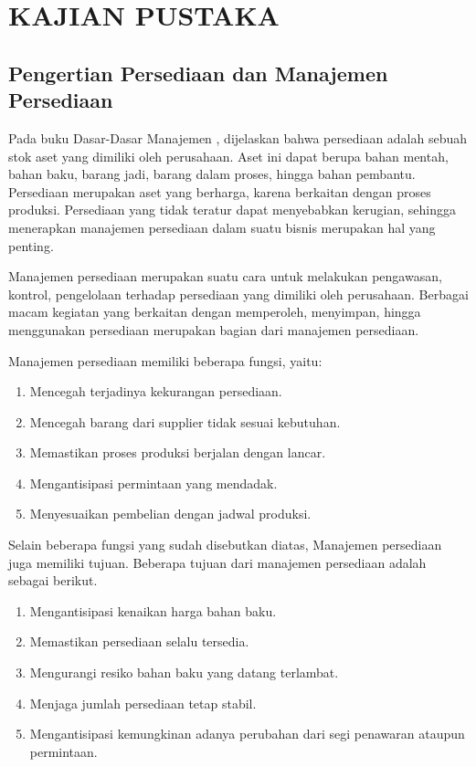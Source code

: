 
\chapter{KAJIAN PUSTAKA} 

\section{Pengertian Persediaan dan Manajemen Persediaan}

Pada buku Dasar-Dasar Manajemen \citep{dasarmanajemen}, dijelaskan bahwa persediaan adalah sebuah stok aset yang dimiliki oleh perusahaan. Aset ini dapat berupa bahan mentah, bahan baku, barang jadi, barang dalam proses, hingga bahan pembantu. Persediaan merupakan aset yang berharga, karena berkaitan dengan proses produksi. Persediaan yang tidak teratur dapat menyebabkan kerugian, sehingga menerapkan manajemen persediaan dalam suatu bisnis merupakan hal yang penting. 

Manajemen persediaan merupakan suatu cara untuk melakukan pengawasan, kontrol, pengelolaan terhadap persediaan yang dimiliki oleh perusahaan. Berbagai macam kegiatan yang berkaitan dengan memperoleh, menyimpan, hingga menggunakan persediaan merupakan bagian dari manajemen persediaan.

Manajemen persediaan memiliki beberapa fungsi, yaitu:
\begin{enumerate}
	\item Mencegah terjadinya kekurangan persediaan.
	\item Mencegah barang dari supplier tidak sesuai kebutuhan.
	\item Memastikan proses produksi berjalan dengan lancar.
	\item Mengantisipasi permintaan yang mendadak.
	\item Menyesuaikan pembelian dengan jadwal produksi.
\end{enumerate}

Selain beberapa fungsi yang sudah disebutkan diatas, Manajemen persediaan juga memiliki tujuan. Beberapa tujuan dari manajemen persediaan adalah sebagai berikut.
\begin{enumerate}
	\item Mengantisipasi kenaikan harga bahan baku.
	\item Memastikan persediaan selalu tersedia.
	\item Mengurangi resiko bahan baku yang datang terlambat.
	\item Menjaga jumlah persediaan tetap stabil.
	\item Mengantisipasi kemungkinan adanya perubahan dari segi penawaran ataupun permintaan.
\end{enumerate}

